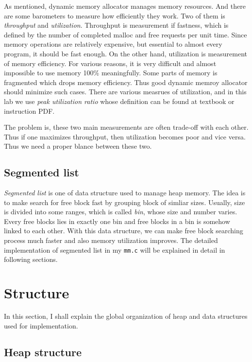 \documentclass[fleqn]{article}
\begin{document}
As mentioned, dynamic memory allocator manages memory resources. And there are some barometers to measure how efficiently they work. Two of them is \textit{throughput} and \textit{utilization}. Throughput is measurement if fastness, which is defined by the number of completed malloc and free requests per unit time. Since memory operations are relatively expensive, but essential to almost every program, it should be fast enough. On the other hand, utilization is measurement of memory efficiency. For various reasons, it is very difficult and almost impossible to use memory 100\% meaningfully. Some parts of memory is fragmented which drops memory efficiency. Thus good dynamic memroy allocator should minimize such cases. There are various measrues of utilization, and in this lab we use \textit{peak utilization ratio} whose definition can be found at textbook or instruction PDF.

The problem is, these two main measurements are often trade-off with each other. Thus if one maximizes throughput, then utilization becomes poor and vice versa. Thus we need a proper blance between these two.

\subsection{Segmented list}

\textit{Segmented list} is one of data structure used to manage heap memory. The idea is to make search for free block fast by grouping block of simliar sizes. Usually, size is divided into some ranges, which is called \textit{bin}, whose size and number varies. Every free blocks lies in exactly one bin and free blocks in a bin is somehow linked to each other. With this data structure, we can make free block searching process much faster and also memory utilization improves. The detailed implementation of segmented list in my \texttt{mm.c} will be explained in detail in following sections.

\section{Structure}

In this section, I shall explain the global organization of heap and data structures used for implementation.

\subsection{Heap structure}
\end{document}
